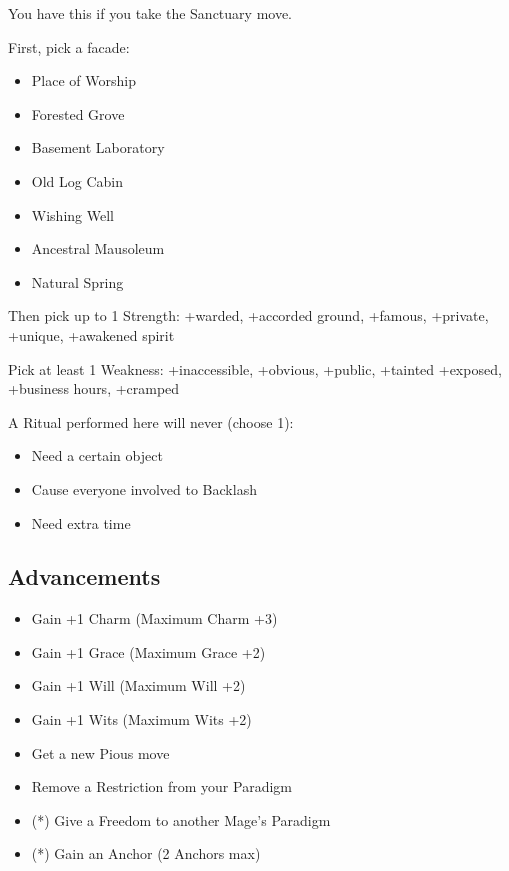 \documentclass[
]{memoir}
\begin{document}
You have this if you take the Sanctuary move.

First, pick a facade:

\begin{itemize}
\tightlist
\item
  Place of Worship
\item
  Forested Grove
\item
  Basement Laboratory
\item
  Old Log Cabin
\item
  Wishing Well
\item
  Ancestral Mausoleum
\item
  Natural Spring
\end{itemize}

Then pick up to 1 Strength: +warded, +accorded ground, +famous,
+private, +unique, +awakened spirit

Pick at least 1 Weakness: +inaccessible, +obvious, +public, +tainted
+exposed, +business hours, +cramped

A Ritual performed here will never (choose 1):

\begin{itemize}
\tightlist
\item
  Need a certain object
\item
  Cause everyone involved to Backlash
\item
  Need extra time
\end{itemize}

\hypertarget{advancements-4}{%
\subsection{Advancements}\label{advancements-4}}

\begin{itemize}
\tightlist
\item
  Gain +1 Charm (Maximum Charm +3)
\item
  Gain +1 Grace (Maximum Grace +2)
\item
  Gain +1 Will (Maximum Will +2)
\item
  Gain +1 Wits (Maximum Wits +2)
\item
  Get a new Pious move
\item
  Remove a Restriction from your Paradigm
\item
  (*) Give a Freedom to another Mage's Paradigm
\item
  (*) Gain an Anchor (2 Anchors max)
\end{itemize}
\end{document}
